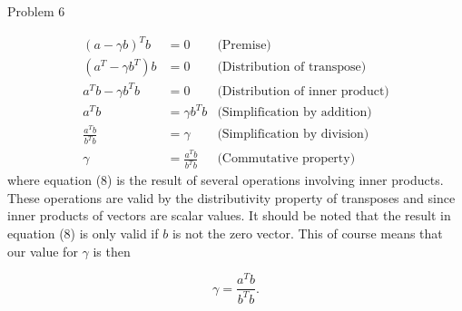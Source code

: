 \begin{problem}{Problem 6}
\begin{Highlight}[Solution]
        \begin{align}
            (a - \gamma b)^{T}b & = 0 & \text{(Premise)} \\
            (a^{T} - \gamma b^{T})b & = 0 & \text{(Distribution of transpose)} \\
            a^{T}b - \gamma b^{T}b & = 0  & \text{(Distribution of inner product)} \\
            a^{T}b & = \gamma b^{T}b & \text{(Simplification by addition)} \\
            \frac{a^{T}b}{b^{T}b} & = \gamma & \text{(Simplification by division)} \\
            \gamma & = \frac{a^{T}b}{b^{T}b} & \text{(Commutative property)}
        \end{align}
        where equation (8) is the result of several operations involving inner products. These operations are valid by the distributivity property of transposes and since inner products of vectors are 
        scalar values. It should be noted that the result in equation (8) is only valid if $b$ is not the zero vector. This of course means that our value for $\gamma$ is then

        \begin{equation}
            \gamma = \frac{a^{T}b}{b^{T}b}.
        \end{equation}
    \end{Highlight}
\end{problem}

